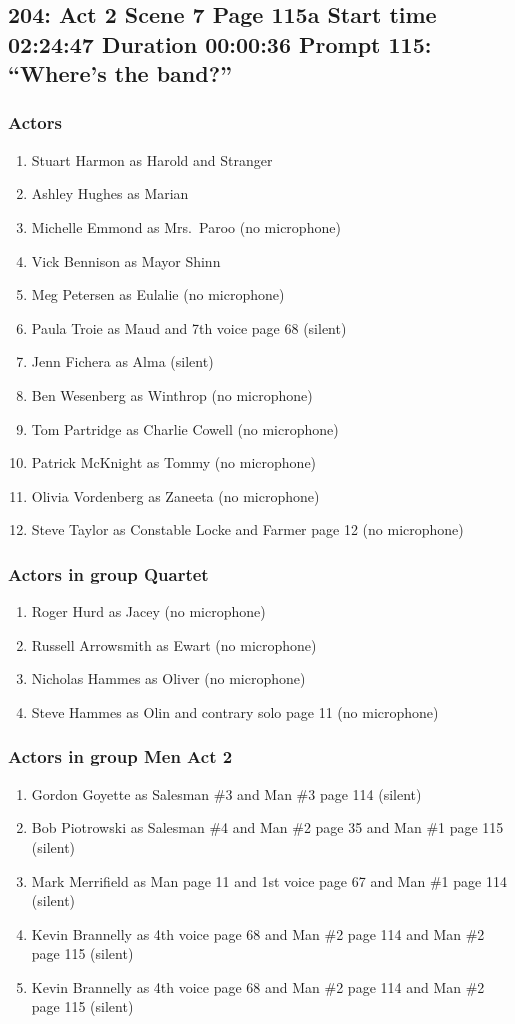 \subsection{204: Act 2 Scene 7 Page 115a Start time 02:24:47 Duration 00:00:36 Prompt 115: ``Where's the band?''}

\subsubsection{Actors}
\begin{enumerate}
\item Stuart Harmon as Harold and Stranger
\item Ashley Hughes as Marian
\item Michelle Emmond as Mrs.~Paroo (no microphone)
\item Vick Bennison as Mayor Shinn
\item Meg Petersen as Eulalie (no microphone)
\item Paula Troie as Maud and 7th voice page 68 (silent)
\item Jenn Fichera as Alma (silent)
\item Ben Wesenberg as Winthrop (no microphone)
\item Tom Partridge as Charlie Cowell (no microphone)
\item Patrick McKnight as Tommy (no microphone)
\item Olivia Vordenberg as Zaneeta (no microphone)
\item Steve Taylor as Constable Locke and Farmer page 12 (no microphone)
\end{enumerate}
\subsubsection{Actors in group Quartet}
\begin{enumerate}
\item Roger Hurd as Jacey (no microphone)
\item Russell Arrowsmith as Ewart (no microphone)
\item Nicholas Hammes as Oliver (no microphone)
\item Steve Hammes as Olin and contrary solo page 11 (no microphone)
\end{enumerate}
\subsubsection{Actors in group Men Act 2}
\begin{enumerate}
\item Gordon Goyette as Salesman \#3 and Man \#3 page 114 (silent)
\item Bob Piotrowski as Salesman \#4 and Man \#2 page 35 and Man \#1 page 115 (silent)
\item Mark Merrifield as Man page 11 and 1st voice page 67 and Man \#1 page 114 (silent)
\item Kevin Brannelly as 4th voice page 68 and Man \#2 page 114 and Man \#2 page 115 (silent)
\item Kevin Brannelly as 4th voice page 68 and Man \#2 page 114 and Man \#2 page 115 (silent)
\end{enumerate}
